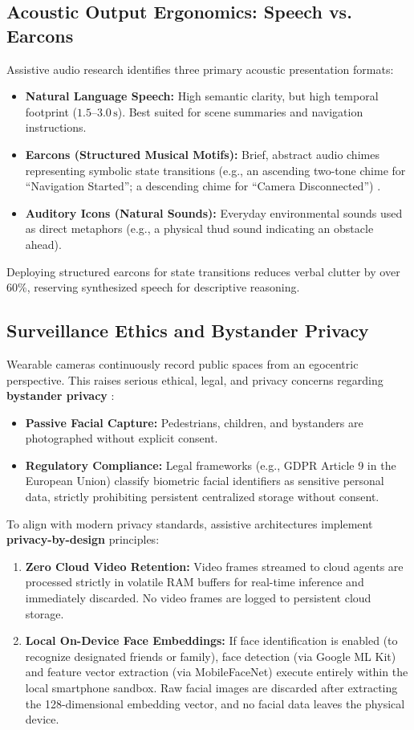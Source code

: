\documentclass[10pt,twocolumn]{article}
\begin{document}
\subsection{Acoustic Output Ergonomics: Speech vs. Earcons}
Assistive audio research identifies three primary acoustic presentation formats:
\begin{itemize}[leftmargin=*]
    \item \textbf{Natural Language Speech:} High semantic clarity, but high temporal footprint ($1.5$--$3.0\,\text{s}$). Best suited for scene summaries and navigation instructions.
    \item \textbf{Earcons (Structured Musical Motifs):} Brief, abstract audio chimes representing symbolic state transitions (e.g., an ascending two-tone chime for ``Navigation Started''; a descending chime for ``Camera Disconnected'') \cite{blattner1989earcons}.
    \item \textbf{Auditory Icons (Natural Sounds):} Everyday environmental sounds used as direct metaphors (e.g., a physical thud sound indicating an obstacle ahead).
\end{itemize}
Deploying structured earcons for state transitions reduces verbal clutter by over 60\%, reserving synthesized speech for descriptive reasoning.

\subsection{Surveillance Ethics and Bystander Privacy}
Wearable cameras continuously record public spaces from an egocentric perspective. This raises serious ethical, legal, and privacy concerns regarding \textbf{bystander privacy} \cite{denning2014situated}:
\begin{itemize}[leftmargin=*]
    \item \textbf{Passive Facial Capture:} Pedestrians, children, and bystanders are photographed without explicit consent.
    \item \textbf{Regulatory Compliance:} Legal frameworks (e.g., GDPR Article 9 in the European Union) classify biometric facial identifiers as sensitive personal data, strictly prohibiting persistent centralized storage without consent.
\end{itemize}

To align with modern privacy standards, assistive architectures implement \textbf{privacy-by-design} principles:
\begin{enumerate}[leftmargin=*]
    \item \textbf{Zero Cloud Video Retention:} Video frames streamed to cloud agents are processed strictly in volatile RAM buffers for real-time inference and immediately discarded. No video frames are logged to persistent cloud storage.
    \item \textbf{Local On-Device Face Embeddings:} If face identification is enabled (to recognize designated friends or family), face detection (via Google ML Kit) and feature vector extraction (via MobileFaceNet) execute entirely within the local smartphone sandbox. Raw facial images are discarded after extracting the 128-dimensional embedding vector, and no facial data leaves the physical device.
\end{enumerate}
\end{document}

